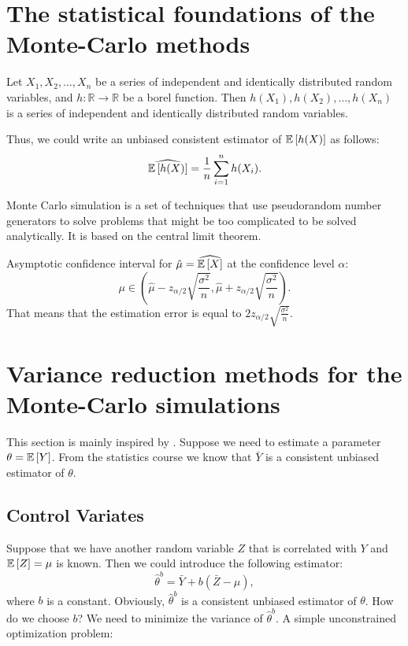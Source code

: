     \section{The statistical foundations of the Monte-Carlo methods}\label{Monte-Carlo:statistical}
        \begin{lemma}
            Let $X_1, X_2, \dots, X_n$ be a series of independent and identically distributed random variables, and $h: \mathbb{R} \to \mathbb{R}$ be a borel function. Then $h(X_1), h(X_2), \dots, h(X_n)$ is a series of independent and identically distributed random variables.
        \end{lemma}
        \noindent Thus, we could write an unbiased consistent estimator of $\mathbb{E} \left[h(X)\right]$ as follows:
        \begin{equation}
            \widehat{\mathbb{E} \left[h(X)\right]} = \frac{1}{n} \sum_{i=1}^n h(X_i).
        \end{equation}
        \begin{definition}
            Monte Carlo simulation is a set of techniques that use pseudorandom number generators to solve problems that might be too complicated to be solved analytically. It is based on the central limit theorem.
        \end{definition}
        \noindent Asymptotic confidence interval for $\hat{\mu} = \widehat{\mathbb{E}\left[X\right]}$ at the confidence level $\alpha$:
        \begin{equation}
            \mu \in \left(\hat{\mu} - z_{\alpha/2} \sqrt{\frac{\sigma^2}{n}}, \hat{\mu} + z_{\alpha/2} \sqrt{\frac{\sigma^2}{n}}\right).
        \end{equation}
        \noindent That means that the estimation error is equal to $2z_{\alpha/2} \sqrt{\frac{\sigma^2}{n}}$.

    \section{Variance reduction methods for the Monte-Carlo simulations}
        This section is mainly inspired by \cite{KobelkovKitapbayev2022,BoyleGlasserman1997}.
        Suppose we need to estimate a parameter $\theta = \mathbb{E}\left[Y\right]$. 
        From the statistics course we know that $\bar Y$ is a consistent unbiased estimator of $\theta$.  
        \subsection{Control Variates}
            Suppose that we have another random variable $Z$ that is correlated with $Y$ and $\mathbb{E}\left[Z\right] = \mu$ is known. Then we could introduce the following estimator:
            \begin{equation}
                \hat\theta^b = \bar Y + b(\bar Z - \mu),
            \end{equation}
            where $b$ is a constant. Obviously, $\hat\theta^b$ is a consistent unbiased estimator of $\theta$. How do we choose $b$? We need to minimize the variance of $\hat\theta^b$. A simple unconstrained optimization problem:

